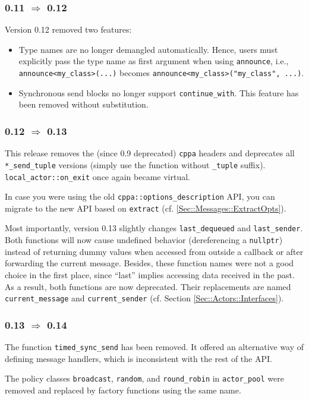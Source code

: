 \clearpage
\subsubsection{0.11 $\Rightarrow$ 0.12}

Version 0.12 removed two features:

\begin{itemize}
\item
Type names are no longer demangled automatically.
Hence, users must explicitly pass the type name as first argument when using \lstinline^announce^, i.e., \lstinline^announce<my_class>(...)^ becomes \lstinline^announce<my_class>("my_class", ...)^.

\item
Synchronous send blocks no longer support \lstinline^continue_with^.
This feature has been removed without substitution.
\end{itemize}

\subsubsection{0.12 $\Rightarrow$ 0.13}

This release removes the (since 0.9 deprecated) \lstinline^cppa^ headers and deprecates all \lstinline^*_send_tuple^ versions (simply use the function without \lstinline^_tuple^ suffix). \lstinline^local_actor::on_exit^ once again became virtual.

In case you were using the old \lstinline^cppa::options_description^ API, you can migrate to the new API based on \lstinline^extract^ (cf. \ref{Sec::Messages::ExtractOpts}).

Most importantly, version 0.13 slightly changes \lstinline^last_dequeued^ and \lstinline^last_sender^.
Both functions will now cause undefined behavior (dereferencing a \lstinline^nullptr^) instead of returning dummy values when accessed from outside a callback or after forwarding the current message.
Besides, these function names were not a good choice in the first place, since ``last'' implies accessing data received in the past.
As a result, both functions are now deprecated.
Their replacements are named \lstinline^current_message^ and \lstinline^current_sender^ (cf. Section \ref{Sec::Actors::Interfaces}).

\subsubsection{0.13 $\Rightarrow$ 0.14}

The function \lstinline^timed_sync_send^ has been removed. It offered an alternative way of defining message handlers, which is inconsistent with the rest of the API.

The policy classes \lstinline^broadcast^, \lstinline^random^, and \lstinline^round_robin^ in \lstinline^actor_pool^ were removed and replaced by factory functions using the same name.